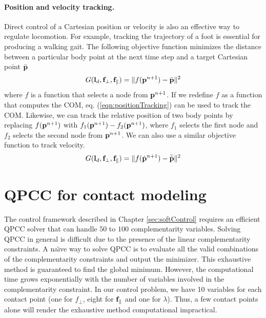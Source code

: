 \paragraph{Position and velocity tracking.}
Direct control of a Cartesian position or velocity is also an effective
way to regulate locomotion. For example, tracking the trajectory of a foot
is essential for producing a walking gait. The following objective function minimizes the distance between a particular body point at the next time step and a target Cartesian point $\bar{\mathbf{p}}$
\begin{equation}
G(\vc{l}_d, \vc{f}_\perp, \vc{f}_\parallel) = \| f(\vc{p}^{n+1}) - \bar{\vc{p}} \|^2
\label{eqn:positionTracking}
\end{equation}
where $f$ is a function that selects a node from $\mathbf{p}^{n+1}$. If we redefine $f$ as a function that computes the COM, eq. (\ref{eqn:positionTracking}) can be used to track the COM. Likewise, we can track the relative position of two body points by replacing $f(\mathbf{p}^{n+1})$ with $f_1(\mathbf{p}^{n+1}) - f_2(\mathbf{p}^{n+1})$, where $f_1$ selects the first node and $f_2$ selects the second node from $\mathbf{p}^{n+1}$. We can also use a similar objective function to track velocity.
\begin{equation}
G(\vc{l}_d, \vc{f}_\perp, \vc{f}_\parallel) = \| f(\dot{\vc{p}}^{n+1}) - \bar{\dot{\vc{p}}} \|^2
\label{eqn:velocityTracking}
\end{equation}


\section{QPCC for contact modeling}
\label{sec:QPCC}

The control framework described in Chapter \ref{sec:softControl} requires
an efficient QPCC solver that can handle $50$ to $100$ complementarity
variables. Solving QPCC in general is difficult due to the presence of
the linear complementarity constraints. A na\"{\i}ve way to solve QPCC is
to evaluate all the valid combinations of the complementarity
constraints and output the minimizer. This exhaustive method is
guaranteed to find the global minimum. However, the computational time
grows exponentially with the number of variables involved in the
complementarity constraint. In our control problem, we have 10
variables for each contact point (one for $f_\perp$, eight for
$\mathbf{f}_\parallel$ and one for $\lambda$). Thus, a few contact points
alone will render the exhaustive method computational impractical.

